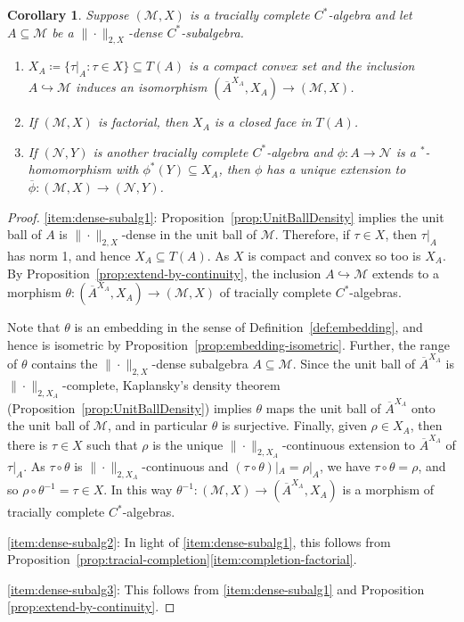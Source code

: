 \documentclass[a4paper,11pt]{amsart}
\newtheorem{corollary}[theorem]{Corollary}
\theoremstyle{definition}
\numberwithin{equation}{section}
\numberwithin{theorem}{section}
\newcommand{\M}{\mathcal{M}}
\newcommand{\completion}[2]{\overline{#1}^{#2}}
\begin{document}
\begin{corollary}\label{cor:dense-subalgebra}
	Suppose $(\M, X)$ is a tracially complete $C^*$-algebra and let $A \subseteq \M$ be a $\|\cdot\|_{2, X}$-dense $C^*$-subalgebra.
	\begin{enumerate}
		\item\label{item:dense-subalg1} $X_A \coloneqq \{\tau|_A : \tau \in X\} \subseteq T(A)$ is a compact convex set and the inclusion $A \hookrightarrow \M$ induces an isomorphism $(\completion{A}{X_A}, X_A) \rightarrow (\M, X)$.
		\item\label{item:dense-subalg2} If $(\M, X)$ is factorial, then $X_A$ is a closed face in $T(A)$.
        \item\label{item:dense-subalg3} If $(\mathcal N,Y)$ is another tracially complete $C^*$-algebra and $\phi\colon A\to \mathcal N$ is a $^*$-homomorphism with $\phi^*(Y)\subseteq X_A$, then $\phi$ has a unique extension to $\overline{\phi}\colon (\M,X)\to(\mathcal N,Y)$.
    \end{enumerate}
\end{corollary}

\begin{proof}
	\ref{item:dense-subalg1}: Proposition~\ref{prop:UnitBallDensity} implies the unit ball of $A$ is $\|\cdot\|_{2, X}$-dense in the unit ball of $\mathcal{M}$.  Therefore, if $\tau \in X$, then $\tau|_A$ has norm 1, and hence $X_A \subseteq T(A)$.  As $X$ is compact and convex so too is $X_A$.  By Proposition~\ref{prop:extend-by-continuity}, the inclusion $A \hookrightarrow \M$ extends to a morphism $\theta \colon (\completion{A}{X_A}, X_A) \rightarrow (\M, X)$ of tracially complete $C^*$-algebras.  
	
	Note that $\theta$ is an embedding in the sense of Definition~\ref{def:embedding}, and hence is isometric by Proposition~\ref{prop:embedding-isometric}.  Further, the range of $\theta$ contains the $\|\cdot\|_{2, X}$-dense subalgebra $A \subseteq \mathcal{M}$.  Since the unit ball of $\completion{A}{X_A}$ is $\|\cdot\|_{2,X_A}$-complete, Kaplansky's density theorem (Proposition~\ref{prop:UnitBallDensity}) implies $\theta$ maps the unit ball of $\completion{A}{X_A}$ onto the unit ball of $\mathcal M$, and in particular $\theta$ is surjective.  Finally, given $\rho\in X_A$, then there is $\tau\in X$ such that $\rho$ is the unique $\|\cdot\|_{2,X_A}$-continuous extension to $\completion{A}{X_A}$ of $\tau|_A$.  As $\tau\circ\theta$ is $\|\cdot\|_{2,X_A}$-continuous and $(\tau\circ\theta)|_A=\rho|_A$, we have $\tau\circ\theta=\rho$, and so $\rho\circ\theta^{-1}=\tau\in X$. In this way $\theta^{-1}\colon(\mathcal M,X)\to(\completion{A}{X_A}, X_A)$ is a morphism of tracially complete $C^*$-algebras.   
    
	\ref{item:dense-subalg2}: In light of \ref{item:dense-subalg1}, this follows from Proposition~\ref{prop:tracial-completion}\ref{item:completion-factorial}.

\ref{item:dense-subalg3}: This follows from \ref{item:dense-subalg1} and Proposition \ref{prop:extend-by-continuity}.
\end{proof}
\end{document}
